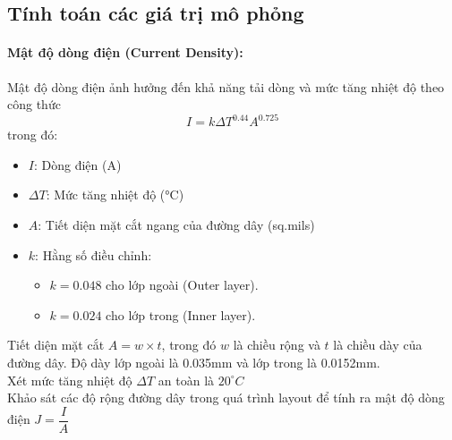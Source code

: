         \subsection{Tính toán các giá trị mô phỏng}
            \paragraph{Mật độ dòng điện (Current Density):}
                Mật độ dòng điện ảnh hưởng đến khả năng tải dòng và mức tăng nhiệt độ theo công thức
                \begin{equation}
                    I = k\Delta T^{0.44}A^{0.725}
                \end{equation}
                trong đó\cite{PrintedBoardDesignIpc2221A}:
                \begin{itemize}
                    \item $I$: Dòng điện (A)
                    \item $\Delta T$: Mức tăng nhiệt độ (°C)
                    \item $A$: Tiết diện mặt cắt ngang của đường dây (sq.mils)  
                    \item $k$: Hằng số điều chỉnh:
                    \begin{itemize}
                        \item $k = 0.048$ cho lớp ngoài (Outer layer).
                        \item $k = 0.024$ cho lớp trong (Inner layer).
                    \end{itemize}
                \end{itemize}
                
                Tiết diện mặt cắt $A = w \times t$, trong đó $w$ là chiều rộng và $t$ là chiều dày của đường dây. Độ dày lớp ngoài là 0.035mm và lớp trong là 0.0152mm.\\
                Xét mức tăng nhiệt độ $\Delta T$ an toàn là $20^{\circ}C$\\
                Khảo sát các độ rộng đường dây trong quá trình layout để tính ra mật độ dòng điện $J = \dfrac{I}{A}$\\

